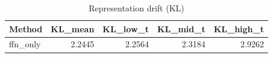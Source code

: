 \begin{table}[htbp]
\centering
\caption{Representation drift (KL)}
\label{tab:repr-drift}
\begin{tabular}{lrrrr}
\toprule
\textbf{Method} & \textbf{KL\_mean} & \textbf{KL\_low\_t} & \textbf{KL\_mid\_t} & \textbf{KL\_high\_t} \\
\midrule
ffn\_only & 2.2445 & 2.2564 & 2.3184 & 2.9262 \\
\bottomrule
\end{tabular}
\end{table}